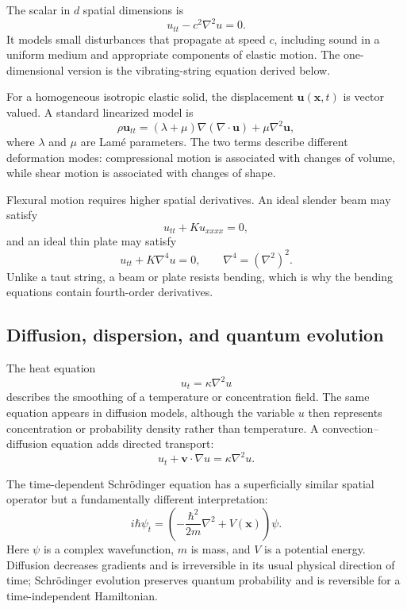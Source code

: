 The scalar  in $d$ spatial dimensions is
\begin{equation}
u_{tt}-c^2\nabla^2u=0.
\end{equation}
It models small disturbances that propagate at speed $c$, including sound in a uniform medium and appropriate components of elastic motion. The one-dimensional version is the vibrating-string equation derived below.

For a homogeneous isotropic elastic solid, the displacement $\mathbf{u}(\mathbf{x},t)$ is vector valued. A standard linearized model is
\begin{equation}
\rho\mathbf{u}_{tt}
=(\lambda+\mu)\nabla(\nabla\cdot\mathbf{u})+\mu\nabla^2\mathbf{u},
\end{equation}
where $\lambda$ and $\mu$ are Lam\'e parameters. The two terms describe different deformation modes: compressional motion is associated with changes of volume, while shear motion is associated with changes of shape.

Flexural motion requires higher spatial derivatives. An ideal slender beam may satisfy
\begin{equation}
u_{tt}+K u_{xxxx}=0,
\end{equation}
and an ideal thin plate may satisfy
\begin{equation}
u_{tt}+K\nabla^4u=0,
\qquad \nabla^4=(\nabla^2)^2.
\end{equation}
Unlike a taut string, a beam or plate resists bending, which is why the bending equations contain fourth-order derivatives.

\subsection{Diffusion, dispersion, and quantum evolution}

The heat equation
\begin{equation}
u_t=\kappa\nabla^2u
\end{equation}
describes the smoothing of a temperature or concentration field. The same equation appears in diffusion models, although the variable $u$ then represents concentration or probability density rather than temperature. A convection--diffusion equation adds directed transport:
\begin{equation}
u_t+\mathbf{v}\cdot\nabla u=\kappa\nabla^2u.
\end{equation}

The time-dependent Schr\"odinger equation has a superficially similar spatial operator but a fundamentally different interpretation:
\begin{equation}
i\hbar\psi_t=
\left(-\frac{\hbar^2}{2m}\nabla^2+V(\mathbf{x})\right)\psi.
\end{equation}
Here $\psi$ is a complex wavefunction, $m$ is mass, and $V$ is a potential energy. Diffusion decreases gradients and is irreversible in its usual physical direction of time; Schr\"odinger evolution preserves quantum probability and is reversible for a time-independent Hamiltonian.

